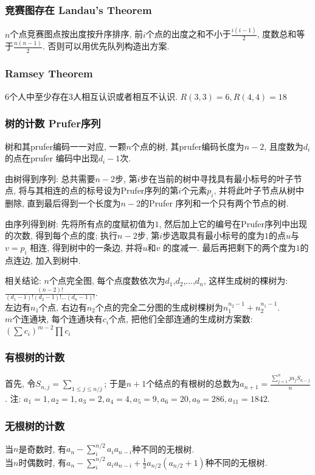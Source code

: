 \subsubsection{竞赛图存在 Landau’s Theorem}
    $n$个点竞赛图点按出度按升序排序, 前$i$个点的出度之和不小于$\frac{i(i-1)}{2}$, 度数总和等于$\frac{n(n-1)}{2}$. 否则可以用优先队列构造出方案.

\subsubsection{Ramsey Theorem}
    $6$个人中至少存在$3$人相互认识或者相互不认识. $R(3,3)=6, R(4,4)=18$

\subsubsection{树的计数 Prufer序列}
    树和其prufer编码一一对应, 一颗$n$个点的树, 其prufer编码长度为${n-2}$, 且度数为$d_i$ 的点在prufer 编码中出现${d_i -1}$次. 
    \par 由树得到序列: 总共需要$n-2$步, 第$i$步在当前的树中寻找具有最小标号的叶子节点, 将与其相连的点的标号设为Prufer序列的第$i$个元素$p_i$, 并将此叶子节点从树中删除, 直到最后得到一个长度为$n-2$的Prufer 序列和一个只有两个节点的树. 
    \par 由序列得到树: 先将所有点的度赋初值为$1$, 然后加上它的编号在Prufer序列中出现的次数, 得到每个点的度; 执行$n-2$步, 第$i$步选取具有最小标号的度为$1$的点$u$与$v=p_i$ 相连, 得到树中的一条边, 并将$u$和$v$ 的度减一. 最后再把剩下的两个度为$1$的点连边, 加入到树中. 
    \par 相关结论: $n$个点完全图, 每个点度数依次为$d_1$,$d_2$,...,$d_n$, 这样生成树的棵树为: ${\frac{(n-2)!}{(d_1-1)!(d_2-1)!...(d_n-1)!}}$.\\
    左边有$n_1$个点, 右边有$n_2$个点的完全二分图的生成树棵树为$n_1^{n_2-1}+n_2^{n_1-1}$. \\
    $m$个连通块, 每个连通块有$c_i$个点, 把他们全部连通的生成树方案数: $(\sum c_i)^{m-2}\prod c_i$
\subsubsection{有根树的计数}\noindent
    首先, 令$S_{n,j}=\sum_{1\leq j\leq n/j}$; 于是$n+1$个结点的有根树的总数为$ a_{n+1}=\frac{\sum_{j=1}^nja_jS_{n-j}}{n}$. 注: $a_1=1,a_2=1,a_3=2,a_4=4,a_5=9,a_6=20,a_9=286,a_11=1842$. 
\subsubsection{无根树的计数}\noindent
    当$n$是奇数时, 有$a_n-\sum_{i}^{n/2}a_ia_{n-i}$种不同的无根树. \\
    当$n$时偶数时, 有$a_n-\sum_{i}^{n/2}a_ia_{n-i}+\frac{1}{2}a_{n/2}(a_{n/2}+1)$种不同的无根树. 
